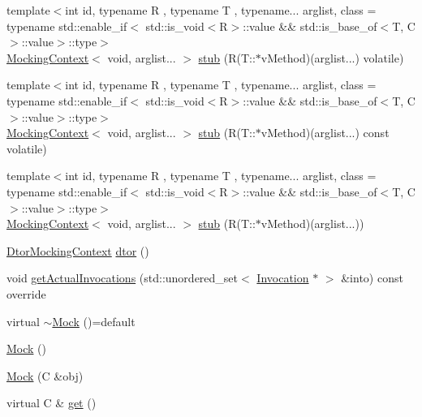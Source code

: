 \begin{DoxyCompactItemize}
\item 
{\footnotesize template$<$int id, typename R , typename T , typename... arglist, class  = typename std\+::enable\+\_\+if$<$                std\+::is\+\_\+void$<$\+R$>$\+::value \&\& std\+::is\+\_\+base\+\_\+of$<$\+T, C$>$\+::value$>$\+::type$>$ }\\\mbox{\hyperlink{classfakeit_1_1MockingContext}{Mocking\+Context}}$<$ void, arglist... $>$ \mbox{\hyperlink{classfakeit_1_1Mock_a8bb1a9ff231e91407f6dea872e2c4a4f}{stub}} (R(T\+::$\ast$v\+Method)(arglist...) volatile)
\item 
{\footnotesize template$<$int id, typename R , typename T , typename... arglist, class  = typename std\+::enable\+\_\+if$<$                std\+::is\+\_\+void$<$\+R$>$\+::value \&\& std\+::is\+\_\+base\+\_\+of$<$\+T, C$>$\+::value$>$\+::type$>$ }\\\mbox{\hyperlink{classfakeit_1_1MockingContext}{Mocking\+Context}}$<$ void, arglist... $>$ \mbox{\hyperlink{classfakeit_1_1Mock_a22b83b574e4db2689c8a1f3375554035}{stub}} (R(T\+::$\ast$v\+Method)(arglist...) const volatile)
\item 
{\footnotesize template$<$int id, typename R , typename T , typename... arglist, class  = typename std\+::enable\+\_\+if$<$                std\+::is\+\_\+void$<$\+R$>$\+::value \&\& std\+::is\+\_\+base\+\_\+of$<$\+T, C$>$\+::value$>$\+::type$>$ }\\\mbox{\hyperlink{classfakeit_1_1MockingContext}{Mocking\+Context}}$<$ void, arglist... $>$ \mbox{\hyperlink{classfakeit_1_1Mock_aeedcaacc82d12295f11c3fc454b75554}{stub}} (R(T\+::$\ast$v\+Method)(arglist...))
\item 
\mbox{\hyperlink{classfakeit_1_1DtorMockingContext}{Dtor\+Mocking\+Context}} \mbox{\hyperlink{classfakeit_1_1Mock_a5c25c5db6e0e1b955137a1330f7348b9}{dtor}} ()
\item 
void \mbox{\hyperlink{classfakeit_1_1Mock_a107ca653b36eb6f72bf9d5acb13c26d8}{get\+Actual\+Invocations}} (std\+::unordered\+\_\+set$<$ \mbox{\hyperlink{structfakeit_1_1Invocation}{Invocation}} $\ast$ $>$ \&into) const override
\item 
virtual \mbox{\hyperlink{classfakeit_1_1Mock_af5ecff29779ab75289c260d0a56705ab}{$\sim$\+Mock}} ()=default
\item 
\mbox{\hyperlink{classfakeit_1_1Mock_af7a86c609a2ee704ee09de6db066c7f4}{Mock}} ()
\item 
\mbox{\hyperlink{classfakeit_1_1Mock_aa474a0d6c7447608253a0fc306eb6ef5}{Mock}} (C \&obj)
\item 
virtual C \& \mbox{\hyperlink{classfakeit_1_1Mock_a139a126982e65ed43a69b21a3a8a6d35}{get}} ()

\end{DoxyCompactItemize}
